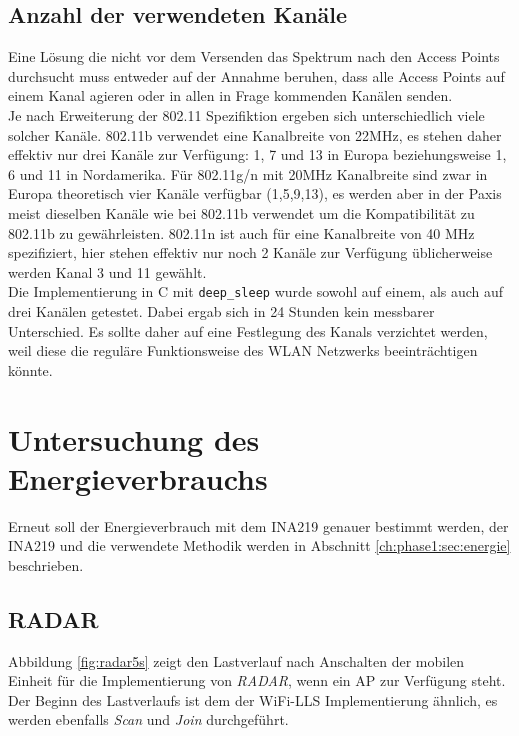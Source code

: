 \subsection{Anzahl der verwendeten Kanäle}
Eine Lösung die nicht vor dem Versenden das Spektrum nach den Access Points durchsucht muss entweder auf der Annahme beruhen, dass alle Access Points auf einem Kanal agieren oder in allen in Frage kommenden Kanälen senden.\\
Je nach Erweiterung der 802.11 Spezifiktion ergeben sich unterschiedlich viele solcher Kanäle.
802.11b verwendet eine Kanalbreite von 22MHz, es stehen daher effektiv nur drei Kanäle zur Verfügung: 1, 7 und 13 in Europa beziehungsweise 1, 6 und 11 in Nordamerika.
Für 802.11g/n mit 20MHz Kanalbreite sind zwar in Europa theoretisch vier Kanäle verfügbar (1,5,9,13), es werden aber in der Paxis meist dieselben Kanäle wie bei 802.11b verwendet um die Kompatibilität zu 802.11b zu gewährleisten.
802.11n ist auch für eine Kanalbreite von 40 MHz spezifiziert, hier stehen effektiv nur noch 2 Kanäle zur Verfügung üblicherweise werden Kanal 3 und 11 gewählt.\\
Die Implementierung in C mit \texttt{deep\_sleep} wurde sowohl auf einem, als auch auf drei Kanälen getestet.
Dabei ergab sich in 24 Stunden kein messbarer Unterschied.
Es sollte daher auf eine Festlegung des Kanals verzichtet werden, weil diese die reguläre Funktionsweise des WLAN Netzwerks beeinträchtigen könnte.


\section{Untersuchung des Energieverbrauchs}
Erneut soll der Energieverbrauch mit dem INA219 genauer bestimmt werden, der INA219 und die verwendete Methodik werden in Abschnitt \ref{ch:phase1:sec:energie} beschrieben.


\subsection{RADAR}
\label{ch:phase2:sec:powerradar}
Abbildung \ref{fig:radar5s} zeigt den Lastverlauf nach Anschalten der mobilen Einheit für die Implementierung von \emph{RADAR}, wenn ein AP zur Verfügung steht. 
Der Beginn des Lastverlaufs ist dem der WiFi-LLS Implementierung ähnlich, es werden ebenfalls \emph{Scan} und \emph{Join} durchgeführt.\\

